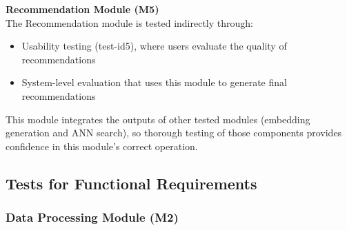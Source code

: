 \documentclass[12pt, titlepage]{article}
\begin{document}
\noindent\textbf{Recommendation Module (M5)}\\
The Recommendation module is tested indirectly through:
\begin{itemize}
    \item Usability testing (test-id5), where users evaluate the quality of recommendations
    \item System-level evaluation that uses this module to generate final recommendations
\end{itemize}

This module integrates the outputs of other tested modules (embedding generation and ANN search), so thorough testing of those components provides confidence in this module's correct operation.


\subsection{Tests for Functional Requirements}


\subsubsection{Data Processing Module (M2)}
\end{document}
